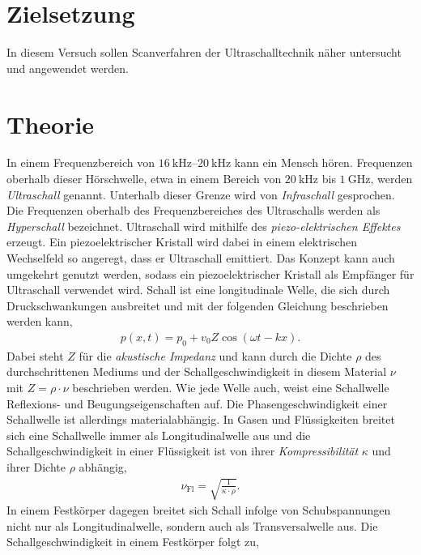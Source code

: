 \section{Zielsetzung}
\label{sec:ziel}

In diesem Versuch sollen Scanverfahren der Ultraschalltechnik näher untersucht und angewendet werden.

\section{Theorie}
\label{sec:Theorie}

In einem Frequenzbereich von $\SIrange{16}{20}{\kilo\hertz}$ kann ein Mensch hören. Frequenzen oberhalb dieser Hörschwelle, etwa in einem Bereich von $\SI{20}{\kilo\hertz}$ 
bis $\SI{1}{\giga\hertz}$, werden \textit{Ultraschall} genannt. Unterhalb dieser Grenze wird von \textit{Infraschall} gesprochen. Die Frequenzen oberhalb des Frequenzbereiches des Ultraschalls 
werden als \textit{Hyperschall} bezeichnet. 
Ultraschall wird mithilfe des \textit{piezo-elektrischen Effektes} erzeugt. Ein piezoelektrischer Kristall wird dabei in einem elektrischen Wechselfeld so angeregt, dass er Ultraschall emittiert. Das Konzept
kann auch umgekehrt genutzt werden, sodass ein piezoelektrischer Kristall als Empfänger für Ultraschall verwendet wird. \newline
Schall ist eine longitudinale Welle, die sich durch Druckschwankungen ausbreitet und mit der folgenden Gleichung beschrieben werden kann,
\begin{align}
    \label{eqn:druckgleichung}
    p(x,t)=p_0+v_0Z\cos\left(\omega t-kx\right).
\end{align}
Dabei steht $Z$ für die \textit{akustische Impedanz} und kann durch die Dichte $\rho$ des durchschrittenen Mediums und der Schallgeschwindigkeit in diesem Material $\nu$
mit $Z=\rho\cdot\nu$ beschrieben werden. Wie jede Welle auch, weist eine Schallwelle Reflexions- und Beugungseigenschaften auf. Die Phasengeschwindigkeit einer Schallwelle ist allerdings materialabhängig.
In Gasen und Flüssigkeiten breitet sich eine Schallwelle immer als Longitudinalwelle aus und die Schallgeschwindigkeit in einer Flüssigkeit ist von ihrer \textit{Kompressibilität} $\kappa$
und ihrer Dichte $\rho$ abhängig,
\begin{align}
    \label{eqn:SchallFlüssig}
    \nu_{\text{Fl}} = \sqrt{\frac{1}{\kappa\cdot\rho}}.
\end{align}
In einem Festkörper dagegen breitet sich Schall infolge von Schubspannungen nicht nur als Longitudinalwelle, sondern auch als Transversalwelle aus. Die Schallgeschwindigkeit in einem Festkörper folgt zu,
